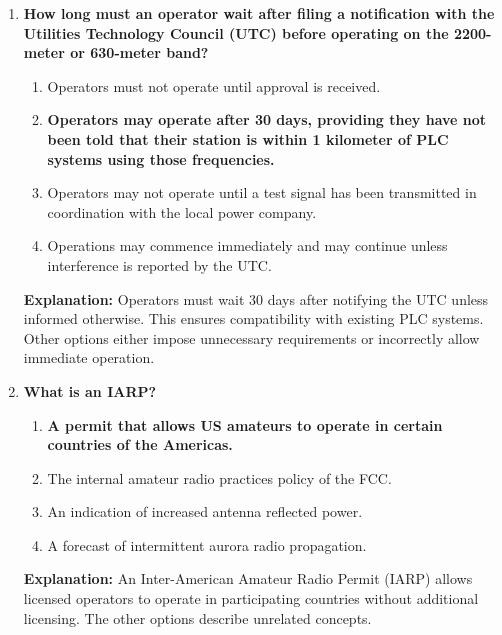 \begin{enumerate}
    \item \textbf{How long must an operator wait after filing a notification with the Utilities Technology Council (UTC) before operating on the 2200-meter or 630-meter band?}
    \begin{enumerate}
        \item Operators must not operate until approval is received.\\
        \item \textbf{Operators may operate after 30 days, providing they have not been told that their station is within 1 kilometer of PLC systems using those frequencies.}\\
        \item Operators may not operate until a test signal has been transmitted in coordination with the local power company.\\
        \item Operations may commence immediately and may continue unless interference is reported by the UTC.
    \end{enumerate}
    \textbf{Explanation:} Operators must wait 30 days after notifying the UTC unless informed otherwise. This ensures compatibility with existing PLC systems. Other options either impose unnecessary requirements or incorrectly allow immediate operation.

    \item \textbf{What is an IARP?}
    \begin{enumerate}
        \item \textbf{A permit that allows US amateurs to operate in certain countries of the Americas.}\\
        \item The internal amateur radio practices policy of the FCC.\\
        \item An indication of increased antenna reflected power.\\
        \item A forecast of intermittent aurora radio propagation.
    \end{enumerate}
    \textbf{Explanation:} An Inter-American Amateur Radio Permit (IARP) allows licensed operators to operate in participating countries without additional licensing. The other options describe unrelated concepts.


\end{enumerate}
